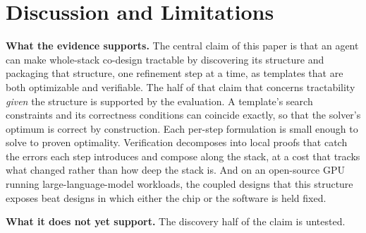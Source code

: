 \documentclass[11pt]{article}
\begin{document}
\hypertarget{discussion-and-limitations}{%
\section{Discussion and Limitations}\label{discussion-and-limitations}}

\textbf{What the evidence supports.} The central claim of this paper is that an agent can make whole-stack co-design tractable by discovering its structure and packaging that structure, one refinement step at a time, as templates that are both optimizable and verifiable. The half of that claim that concerns tractability \emph{given} the structure is supported by the evaluation. A template's search constraints and its correctness conditions can coincide exactly, so that the solver's optimum is correct by construction. Each per-step formulation is small enough to solve to proven optimality. Verification decomposes into local proofs that catch the errors each step introduces and compose along the stack, at a cost that tracks what changed rather than how deep the stack is. And on an open-source GPU running large-language-model workloads, the coupled designs that this structure exposes beat designs in which either the chip or the software is held fixed.

\textbf{What it does not yet support.} The discovery half of the claim is untested.
\end{document}
